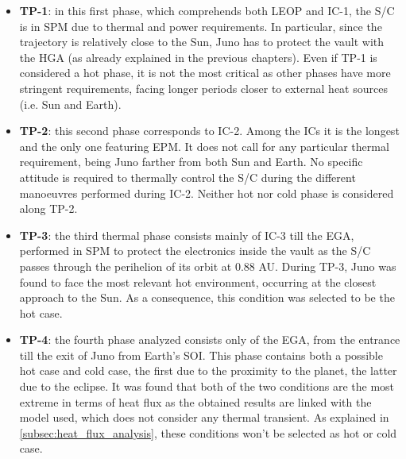 \begin{itemize}
    \item \textbf{TP-1}:
    in this first phase, which comprehends both LEOP and IC-1, the S/C is in SPM due to thermal and power requirements. In particular, since the trajectory is relatively close to the Sun, Juno has to protect the vault with the HGA (as already explained in the previous chapters).
    Even if TP-1 is considered a hot phase, it is not the most critical as other phases have more stringent requirements, facing longer periods closer to external heat sources (i.e. Sun and Earth).

    \item \textbf{TP-2}:
    this second phase corresponds to IC-2. Among the ICs it is the longest and the only one featuring EPM. It does not call for any particular thermal requirement, being Juno farther from both Sun and Earth.
    No specific attitude is required to thermally control the S/C during the different manoeuvres performed during IC-2. Neither hot nor cold phase is considered along TP-2.
    
    \item \textbf{TP-3}:
    the third thermal phase consists mainly of IC-3 till the EGA, performed in SPM to protect the electronics inside the vault as the S/C passes through the perihelion of its orbit at 0.88 AU.
    During TP-3, Juno was found to face the most relevant hot environment, occurring at the closest approach to the Sun. As a consequence, this condition was selected to be the hot case.
    
    \item \textbf{TP-4}:
    the fourth phase analyzed consists only of the EGA, from the entrance till the exit of Juno from Earth's SOI. This phase contains both a possible hot case and cold case, the first due to the proximity to the planet, the latter due to the eclipse. It was found that both of the two conditions are the most extreme in terms of heat flux as the obtained results are linked with the model used, which does not consider any thermal transient. As explained in \autoref{subsec:heat_flux_analysis}, these conditions won't be selected as hot or cold case.

    

\end{itemize}
